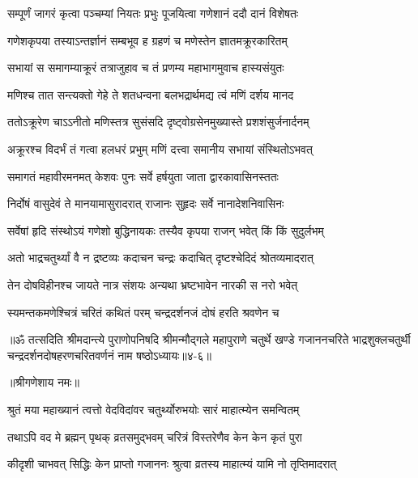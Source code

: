 \twolineshloka
{सम्पूर्णं जागरं कृत्वा पञ्चम्यां नियतः प्रभुः}
{पूजयित्वा गणेशानं ददौ दानं विशेषतः} %

\twolineshloka
{गणेशकृपया तस्याऽन्तर्ज्ञानं सम्बभूव ह}
{ग्रहणं च मणेस्तेन ज्ञातमक्रूरकारितम्} %

\twolineshloka
{सभायां स समागम्याक्रूरं तत्राजुहाव च}
{तं प्रणम्य महाभागमुवाच हास्यसंयुतः} %

\twolineshloka
{मणिश्च तात सन्त्यक्तो गेहे ते शतधन्वना}
{बलभद्रार्थमद्य त्वं मणिं दर्शय मानद} %

\twolineshloka
{ततोऽक्रूरेण चाऽऽनीतो मणिस्तत्र सुसंसदि}
{दृष्ट्वोग्रसेनमुख्यास्ते प्रशशंसुर्जनार्दनम्} %

\twolineshloka
{अक्रूरश्च विदर्भं तं गत्वा हलधरं प्रभुम्}
{मणिं दत्त्वा समानीय सभायां संस्थितोऽभवत्} %

\twolineshloka
{समागतं महावीरमनमत् केशवः पुनः}
{सर्वे हर्षयुता जाता द्वारकावासिनस्ततः} %

\twolineshloka
{निर्दोषं वासुदेवं ते मानयामासुरादरात्}
{राजानः सुहृदः सर्वे नानादेशनिवासिनः} %

\twolineshloka
{सर्वेषां हृदि संस्थोऽयं गणेशो बुद्धिनायकः}
{तस्यैव कृपया राजन् भवेत् किं किं सुदुर्लभम्} %

\twolineshloka
{अतो भाद्रचतुर्थ्यां वै न द्रष्टव्यः कदाचन}
{चन्द्रः कदाचित् दृष्टश्चेदिदं श्रोतव्यमादरात्} %

\twolineshloka
{तेन दोषविहीनश्च जायते नात्र संशयः}
{अन्यथा भ्रष्टभावेन नारकी स नरो भवेत्} %

\twolineshloka
{स्यमन्तकमणेश्चित्रं चरितं कथितं परम्}
{चन्द्रदर्शनजं दोषं हरति श्रवणेन च} %

॥ॐ तत्सदिति श्रीमदान्त्ये पुराणोपनिषदि श्रीमन्मौद्गले महापुराणे चतुर्थे खण्डे गजाननचरिते भाद्रशुक्लचतुर्थी चन्द्रदर्शनदोषहरणचरितवर्णनं नाम षष्ठोऽध्यायः॥४-६॥


\label{sec:bhadrapada-shukla-chaturthi-mahatmya-varnanam}

\centerline{॥श्रीगणेशाय नमः॥}


\twolineshloka
{श्रुतं मया महाख्यानं त्वत्तो वेदविदांवर}
{चतुर्थ्योरुभयोः सारं माहात्म्येन समन्वितम्} %

\twolineshloka
{तथाऽपि वद मे ब्रह्मन् पृथक् व्रतसमुद्भवम्}
{चरित्रं विस्तरेणैव केन केन कृतं पुरा} %

\twolineshloka
{कीदृशी चाभवत् सिद्धिः केन प्राप्तो गजाननः}
{श्रुत्वा व्रतस्य माहात्म्यं यामि नो तृप्तिमादरात्} %

